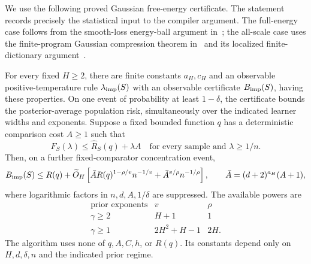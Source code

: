 We use the following proved Gaussian free-energy certificate. The statement records precisely the statistical input to the compiler argument. The full-energy case follows from the smooth-loss energy-ball argument in~\cite{adaptive}; the all-scale case uses the finite-program Gaussian compression theorem in~\cite{direct} and its localized finite-dictionary argument~\cite{localized}.

\begin{lemma}
\label{lem:boolean-Gaussian-certificate}
For every fixed $H\ge2$, there are finite constants $a_H,c_H$ and an observable positive-temperature rule $\lambda_{\rm imp}(S)$ with an observable certificate $B_{\rm imp}(S)$, having these properties. On one event of probability at least $1-\delta$, the certificate bounds the posterior-average population risk, simultaneously over the indicated learner widths and exponents. Suppose a fixed bounded function $q$ has a deterministic comparison cost $A\ge1$ such that
\begin{equation}
 F_S(\lambda)\le\widehat R_S(q)+\lambda A
 \quad\text{for every sample and }\lambda\ge1/n.
 \label{eq:boolean-comparison-interface}
\end{equation}
Then, on a further fixed-comparator concentration event,
\begin{equation}
 B_{\rm imp}(S)\le R(q)+
 \widetilde O_H\left[
  \bar A R(q)^{1-\rho/v}n^{-1/v}
       +\bar A^{v/\rho}n^{-1/\rho}\right],
 \qquad \bar A=(d+2)^{a_H}(A+1),
 \label{eq:boolean-certificate-oracle}
\end{equation}
where logarithmic factors in $n,d,A,1/\delta$ are suppressed. The available powers are
\[
\begin{array}{c|c|c}
\text{prior exponents}&v&\rho\\ \hline
\gamma\ge2&H+1&1\\
\gamma\ge1&2H^2+H-1&2H.
\end{array}
\]
The algorithm uses none of $q,A,C,h$, or $R(q)$. Its constants depend only on $H,d,\delta,n$ and the indicated prior regime.
\end{lemma}
